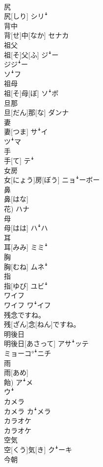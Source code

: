 \documentclass[8pt]{extreport}
\begin{document}
\begin{CJK}{UTF8}{min}
\\	尻	
\\	尻[しり]	シリꜜ
\\	背中	
\\	背[せ]中[なか]	セナカ
\\	祖父	
\\	祖[そ]父[ふ]	ジꜜー 
\\	ジジꜜー 
\\	ソꜜフ
\\	祖母	
\\	祖[そ]母[ぼ]	ソꜜボ
\\	旦那	
\\	旦[だん]那[な]	ダンナ
\\	妻	
\\	妻[つま]	サꜜイ 
\\	ツꜜマ
\\	手	
\\	手[て]	テꜜ
\\	女房	
\\	女[にょう]房[ぼう]	ニョꜜーボー
\\	鼻	
\\	鼻[はな] 
\\	花)	ハナ
\\	母	
\\	母[はは]	ハꜜハ
\\	耳	
\\	耳[みみ]	ミミꜜ
\\	胸	
\\	胸[むね]	ムネꜜ
\\	指	
\\	指[ゆび]	ユビꜜ
\\	ワイフ	
\\	ワイフ	ワꜜイフ
\\	残念ですね。	
\\	残[ざん]念[ねん]ですね。	
\\	明後日	
\\	明後日[あさって]	アサꜜッテ 
\\	ミョーコ°ꜜニチ
\\	雨	
\\	雨[あめ] 
\\	飴)	アꜜメ 
\\	ウꜜ
\\	カメラ	
\\	カメラ	カꜜメラ
\\	カラオケ	
\\	カラオケ	
\\	空気	
\\	空[くう]気[き]	クꜜーキ
\\	今朝	

\end{CJK}
\end{document}

